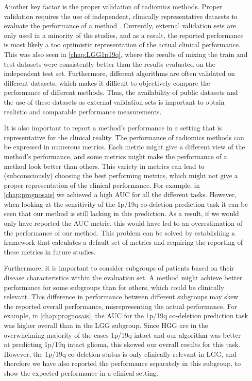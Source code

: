 Another key factor is the proper validation of radiomics methods.
Proper validation requires the use of independent, clinically representative datasets to evaluate the performance of a method \autocite{gillies2016radiomics, rizzo2018radiomics, lohmann2020radiomics, yip2016applications}.
Currently, external validation sets are only used in a minority of the studies, and as a result, the reported performance is most likely a too optimistic representation of the actual clinical performance.
This was also seen in \cref{chap:LGG1p19q}, where the results of mixing the train and test datasets were consistently better than the results evaluated on the independent test set.
Furthermore, different algorithms are often validated on different datasets, which makes it difficult to objectively compare the performance of different methods.
Thus, the availability of public datasets and the use of these datasets as external validation sets is important to obtain realistic and comparable performance measurements.

It is also important to report a method's performance in a setting that is representative for the clinical reality.
The performance of radiomics methods can be expressed in numerous metrics.
Each metric might give a different view of the method's performance, and some metrics might make the performance of a method look better than others.
This variety in metrics can lead to (subconsciously) choosing the best performing metrics, which might not give a proper representation of the clinical performance.
For example, in \cref{chap:prognosais} we achieved a high \gls{AUC} for all the different tasks.
However, when looking at the sensitivity of the 1p/19q co-deletion prediction task it can be seen that our method is still lacking in this prediction.
As a result, if we would only have reported the \gls{AUC} metric, this would have led to an overestimation of the performance of our method.
This problem can be solved by establishing a framework that calculates a default set of metrics and requiring the reporting of these metrics in future studies.


Furthermore, it is important to consider subgroups of patients based on their disease characteristics within the evaluation set.
A method might achieve better performance for some subgroups than for others, which could be clinically relevant.
This difference in performance between different subgroups may skew the reported overall performance, misrepresenting the actual performance.
For example, in \cref{chap:prognosais}, the \gls{AUC} for the 1p/19q co-deletion prediction task was higher overall than in the \gls{LGG} subgroup.
Since \gls{HGG} are in the overwhelming majority of the cases 1p/19q intact and our algorithm was better at predicting 1p/19q intact glioma, this skewed our overall results for this task.
However, the 1p/19q co-deletion status is only clinically relevant in \gls{LGG}, and therefore we have also reported the performance separately in this subgroup, to show the expected performance in a clinical setting.


